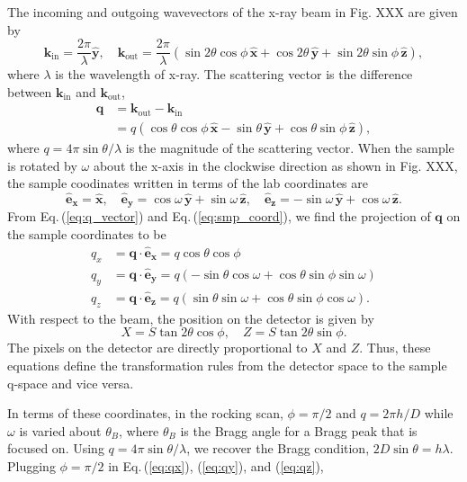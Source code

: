 \documentclass[12pt,letterpaper]{article}
\newcommand{\Eq}[1]{Eq.\,(\ref{#1})}%
\newcommand{\xhat}{\mathbf{\hat{x}}}
\newcommand{\yhat}{\mathbf{\hat{y}}}
\newcommand{\zhat}{\mathbf{\hat{z}}}
\newcommand{\kin}{\mathbf{k}_{\mathrm{in}}}
\newcommand{\kout}{\mathbf{k}_{\mathrm{out}}}
\begin{document}
The incoming and outgoing wavevectors of the x-ray beam in Fig. XXX 
are given by
\begin{equation}
  \kin = \frac{2\pi}{\lambda} \yhat, \quad
  \kout = 
    \frac{2\pi}{\lambda} \left( 
      \sin 2\theta \cos\phi \, \xhat
      + \cos 2\theta \, \yhat
      + \sin 2\theta \sin\phi \, \zhat 
    \right),
  \label{eq:kinkout}
\end{equation}
where $\lambda$ is the wavelength of x-ray. The scattering vector is
the difference between $\kin$ and $\kout$,
\begin{align}
  \mathbf{q} &= \kout - \kin \nonumber \\
             &= q \left( 
                  \cos\theta\cos\phi \, \xhat - \sin\theta \, \yhat
                  + \cos\theta\sin\phi \, \zhat
                \right),
  \label{eq:q_vector}
\end{align}
where $q=4\pi\sin\theta/\lambda$ is the magnitude of the scattering vector. 
When the sample is rotated by $\omega$ about the x-axis in the clockwise 
direction as shown in Fig. XXX, the sample coodinates written in terms of 
the lab coordinates are  
\begin{equation}
  \mathbf{\hat{e}_x} = \xhat, \quad
  \mathbf{\hat{e}_y} = \cos\omega\,\yhat + \sin\omega\,\zhat, \quad
  \mathbf{\hat{e}_z} = -\sin\omega\,\yhat + \cos\omega\,\zhat.
  \label{eq:smp_coord}
\end{equation}
From \Eq{eq:q_vector} and \Eq{eq:smp_coord}, we find the projection of $\mathbf{q}$ on the sample coordinates to be
\begin{align}
  q_x &= \mathbf{q}\cdot\mathbf{\hat{e}_x} 
       = q\cos\theta\cos\phi 
       \label{eq:qx} \\
  q_y &= \mathbf{q}\cdot\mathbf{\hat{e}_y} 
       = q\left(-\sin\theta\cos\omega + \cos\theta\sin\phi\sin\omega\right) 
       \label{eq:qy} \\
  q_z &= \mathbf{q}\cdot\mathbf{\hat{e}_z} 
       = q\left(\sin\theta\sin\omega + \cos\theta\sin\phi\cos\omega\right).
       \label{eq:qz}
\end{align}
With respect to the beam, the position on the detector is given by
\begin{equation}
  X = S \tan 2\theta \cos\phi, \quad Z = S \tan 2\theta \sin\phi.
\end{equation} 
The pixels on the detector are directly proportional to $X$ and $Z$. Thus,
these equations define the transformation rules from the detector space
to the sample q-space and vice versa.

In terms of these coordinates, in the rocking scan, $\phi=\pi/2$ and $q=2\pi h/D$
while $\omega$ is varied about $\theta_B$, where $\theta_B$ is the Bragg
angle for a Bragg peak that is focused on. Using $q=4\pi\sin\theta/\lambda$, 
we recover the Bragg condition, $2D\sin\theta=h\lambda$. Plugging $\phi=\pi/2$
in Eq.\,(\ref{eq:qx}), (\ref{eq:qy}), and (\ref{eq:qz}), 
\end{document}

